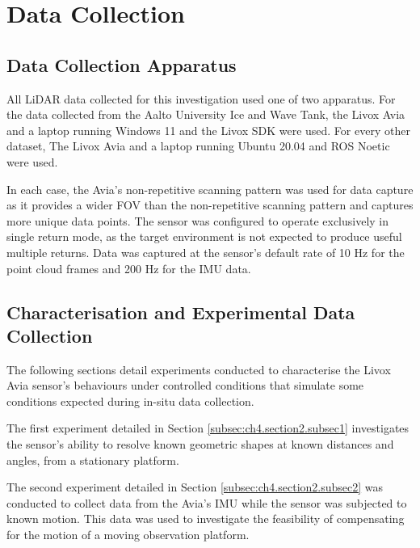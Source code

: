 \chapter{Data Collection}
\label{ch:data_collection}

\section{Data Collection Apparatus}
\label{sec:ch4.section1}

All \ac{LiDAR} data collected for this investigation used one of two apparatus. For the data collected from the Aalto University Ice and Wave Tank, the Livox Avia and a laptop running Windows 11 and the Livox SDK were used. For every other dataset, The Livox Avia and a laptop running Ubuntu 20.04 and \ac{ROS} Noetic were used.

In each case, the Avia's non-repetitive scanning pattern was used for data capture as it provides a wider \ac{FOV} than the non-repetitive scanning pattern and captures more unique data points. The sensor was configured to operate exclusively in single return mode, as the target environment is not expected to produce useful multiple returns. Data was captured at the sensor's default rate of 10 Hz for the point cloud frames and 200 Hz for the \ac{IMU} data.

\section{Characterisation and Experimental Data Collection}
\label{sec:ch4.section2}

The following sections detail experiments conducted to characterise the Livox Avia sensor's behaviours under controlled conditions that simulate some conditions expected during in-situ data collection.

The first experiment detailed in Section \ref{subsec:ch4.section2.subsec1} investigates the sensor's ability to resolve known geometric shapes at known distances and angles, from a stationary platform. 

The second experiment detailed in Section \ref{subsec:ch4.section2.subsec2} was conducted to collect data from the Avia's \ac{IMU} while the sensor was subjected to known motion. This data was used to investigate the feasibility of compensating for the motion of a moving observation platform.

